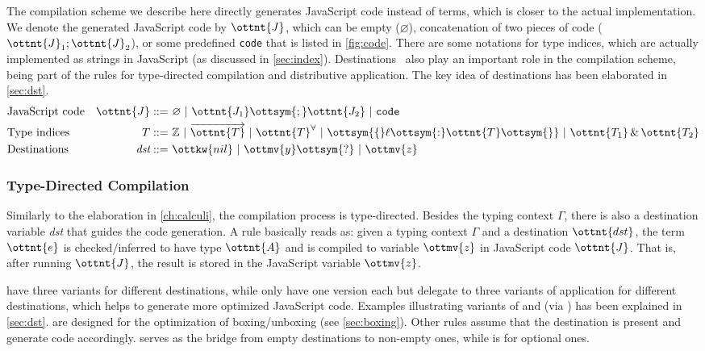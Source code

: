 \noindent
The compilation scheme we describe here directly generates JavaScript code
instead of \lambdar terms, which is closer to the actual implementation. We
denote the generated JavaScript code by $\ottnt{J}$, which can be empty
($\varnothing$), concatenation of two pieces of code
($\ottnt{J}_1;\ottnt{J}_2$), or some predefined \texttt{code} that is listed in
\autoref{fig:code}. There are some notations for type indices, which are
actually implemented as strings in JavaScript (as discussed in
\autoref{sec:index}). Destinations~\citep{shaikhha2017destination} also play an
important role in the compilation scheme, being part of the rules for
type-directed compilation and distributive application. The key idea of
destinations has been elaborated in \autoref{sec:dst}.
\begin{align*}
  &\text{JavaScript code}&\ottnt{J} ::=&~  \varnothing  ~|~ \ottnt{J_{{\mathrm{1}}}}  \ottsym{;}  \ottnt{J_{{\mathrm{2}}}} ~|~ \mathtt{code} \\
  &\text{Type indices}&           T ::=&~  \mathbb{Z}  ~|~  \overrightarrow{ \ottnt{T} }  ~|~  \ottnt{T} ^\forall  ~|~ \ottsym{\{}  \ell  \ottsym{:}  \ottnt{T}  \ottsym{\}} ~|~ \ottnt{T_{{\mathrm{1}}}}  \, \& \,  \ottnt{T_{{\mathrm{2}}}} \\
  &\text{Destinations}&\textit{dst} ::=&~ \ottkw{nil} ~|~ \ottmv{y}  \ottsym{\mbox{?}} ~|~ \ottmv{z}
\end{align*}

\subsubsection{Type-Directed Compilation}

Similarly to the elaboration in \autoref{ch:calculi}, the compilation process
is type-directed. Besides the typing context $\Gamma$, there is also a
destination variable \textit{dst} that guides the code generation. A rule
basically reads as: given a typing context $\Gamma$ and a destination
$\ottnt{dst}$, the \fiplus term $\ottnt{e}$ is checked/inferred to have type $\ottnt{A}$
and is compiled to variable $\ottmv{z}$ in JavaScript code $\ottnt{J}$. That is,
after running $\ottnt{J}$, the result is stored in the JavaScript variable
$\ottmv{z}$.

 have three variants for different destinations, while
 only have one version each but delegate to three variants of
application for different destinations, which helps to generate more optimized
JavaScript code. Examples illustrating variants of  and
 (via ) has been explained in \autoref{sec:dst}.
 are designed for the optimization of boxing/unboxing
(see \autoref{sec:boxing}). Other rules assume that the destination is present
and generate code accordingly.  serves as the bridge from empty
destinations to non-empty ones, while  is for optional ones.


